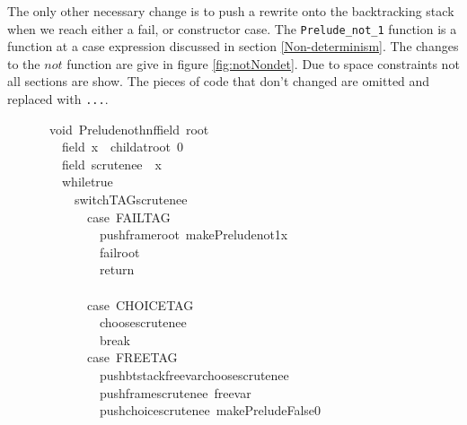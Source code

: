 \documentclass{book}
\theoremstyle{definition}
\newcommand{\Varid}[1]{\mathit{#1}}
\begin{document}
The only other necessary change is to push a rewrite onto the backtracking stack
when we reach either a fail, or constructor case.
The \texttt{Prelude\_not\_1} function is a function at a case expression discussed
in section \ref{Non-determinism}.
The changes to the \ensuremath{\Varid{not}} function are give in figure \ref{fig:notNondet}.
Due to space constraints not all sections are show.
The pieces of code that don't changed are omitted and replaced with \texttt{...}.

\begin{figure}
\begin{tabbing}\ttfamily
~void~Preludenothnffield~root~\\
\ttfamily ~~~field~x~~childatroot~0\\
\ttfamily ~~~field~scrutenee~~x\\
\ttfamily ~~~whiletrue~\\
\ttfamily ~~~~~switchTAGscrutenee~\\
\ttfamily ~~~~~~~case~FAILTAG\\
\ttfamily ~~~~~~~~~pushframeroot~makePreludenot1x\\
\ttfamily ~~~~~~~~~failroot\\
\ttfamily ~~~~~~~~~return\\
\ttfamily ~~~~~~~\\
\ttfamily ~~~~~~~case~CHOICETAG\\
\ttfamily ~~~~~~~~~choosescrutenee\\
\ttfamily ~~~~~~~~~break\\
\ttfamily ~~~~~~~case~FREETAG\\
\ttfamily ~~~~~~~~~pushbtstackfreevarchoosescrutenee\\
\ttfamily ~~~~~~~~~pushframescrutenee~freevar\\
\ttfamily ~~~~~~~~~pushchoicescrutenee~makePreludeFalse0\\

\end{tabbing}
\end{figure}
\end{document}
